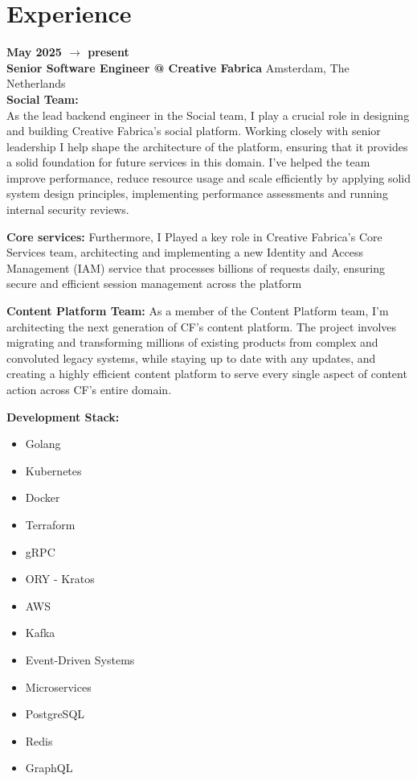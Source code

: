 \documentclass[10pt]{friggeri-cv} %
\renewcommand{\entry}[4]{%
  \textbf{#1} \\
\textbf{#2}%
    \hfill%
    {\footnotesize\addfontfeature{Color=lightgray} #3}\\%
    #4\vspace{0.3\parsep}%
}
\begin{document}
\section{Experience}
\entry
{May 2025 $\rightarrow$  present}
{\normalfont Senior Software Engineer @ \textbf{Creative Fabrica}}
{Amsterdam, The Netherlands}
{\textbf{Social Team:} \\
As the lead backend engineer in the Social team, I play a crucial role in designing and building  Creative Fabrica's social platform. Working closely with senior leadership I help shape the architecture of the platform, ensuring that it provides a solid foundation for future services in this domain. 
I've helped the team improve performance, reduce resource usage and scale efficiently by applying solid system design principles, implementing performance assessments and running internal security reviews.

\textbf{Core services:}
Furthermore, I Played a key role in Creative Fabrica's Core Services team, architecting and implementing a new Identity and Access Management (IAM) service that processes billions of requests daily, ensuring secure and efficient session management across the platform

\textbf{Content Platform Team:}
As a member of the Content Platform team, I'm architecting the next generation of CF's content platform. The project involves migrating and transforming millions of existing products from complex and convoluted legacy systems, while staying up to date with any updates, and creating a highly efficient content platform to serve every single aspect of content action across CF's entire domain.

\textbf{Development Stack:}\\
\begin{minipage}[t]{0.5\textwidth}
  \begin{itemize}
      \item Golang
      \item Kubernetes
      \item Docker
      \item Terraform
      \item gRPC
      \item ORY - Kratos
  \end{itemize}
\end{minipage}%
%
\begin{minipage}[t]{0.5\textwidth}
  \begin{itemize}
      \item AWS
      \item Kafka
      \item Event-Driven Systems
      \item Microservices
      \item PostgreSQL
      \item Redis
      \item GraphQL
  \end{itemize}
\end{minipage}%
}
\\\\\
\end{document}
